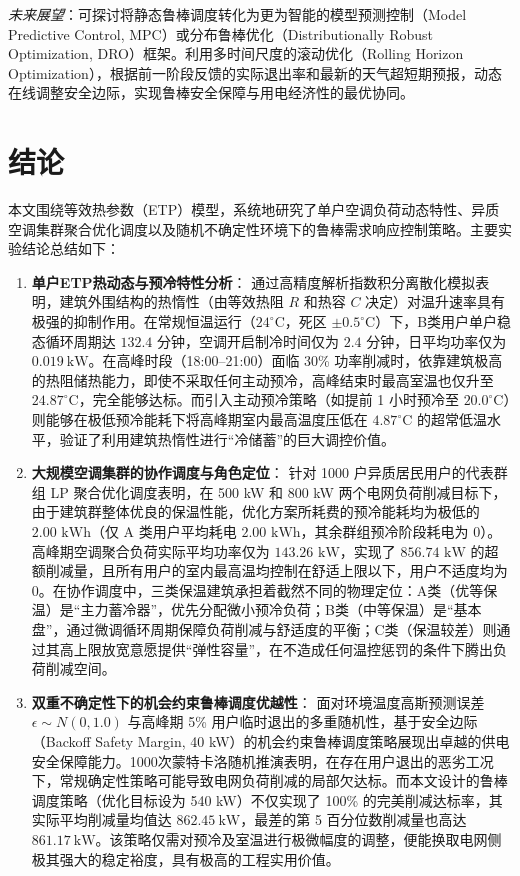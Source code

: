\documentclass[12pt,a4paper]{article}
\begin{document}
\begin{enumerate}
    \textit{未来展望}：可探讨将静态鲁棒调度转化为更为智能的模型预测控制（Model Predictive Control, MPC）或分布鲁棒优化（Distributionally Robust Optimization, DRO）框架。利用多时间尺度的滚动优化（Rolling Horizon Optimization），根据前一阶段反馈的实际退出率和最新的天气超短期预报，动态在线调整安全边际，实现鲁棒安全保障与用电经济性的最优协同。
\end{enumerate}


\section{结论}
本文围绕等效热参数（ETP）模型，系统地研究了单户空调负荷动态特性、异质空调集群聚合优化调度以及随机不确定性环境下的鲁棒需求响应控制策略。主要实验结论总结如下：

\begin{enumerate}
    \item \textbf{单户ETP热动态与预冷特性分析}：
    通过高精度解析指数积分离散化模拟表明，建筑外围结构的热惰性（由等效热阻 $R$ 和热容 $C$ 决定）对温升速率具有极强的抑制作用。在常规恒温运行（$24^\circ\text{C}$，死区 $\pm 0.5^\circ\text{C}$）下，B类用户单户稳态循环周期达 $132.4$ 分钟，空调开启制冷时间仅为 $2.4$ 分钟，日平均功率仅为 $0.019\ \text{kW}$。在高峰时段（18:00--21:00）面临 30\% 功率削减时，依靠建筑极高的热阻储热能力，即使不采取任何主动预冷，高峰结束时最高室温也仅升至 $24.87^\circ\text{C}$，完全能够达标。而引入主动预冷策略（如提前 1 小时预冷至 $20.0^\circ\text{C}$）则能够在极低预冷能耗下将高峰期室内最高温度压低在 $4.87^\circ\text{C}$ 的超常低温水平，验证了利用建筑热惰性进行“冷储蓄”的巨大调控价值。
    
    \item \textbf{大规模空调集群的协作调度与角色定位}：
    针对 1000 户异质居民用户的代表群组 LP 聚合优化调度表明，在 500 kW 和 800 kW 两个电网负荷削减目标下，由于建筑群整体优良的保温性能，优化方案所耗费的预冷能耗均为极低的 $2.00\text{ kWh}$（仅 A 类用户平均耗电 $2.00\text{ kWh}$，其余群组预冷阶段耗电为 $0$）。高峰期空调聚合负荷实际平均功率仅为 $143.26\text{ kW}$，实现了 $856.74\text{ kW}$ 的超额削减量，且所有用户的室内最高温均控制在舒适上限以下，用户不适度均为 $0$。在协作调度中，三类保温建筑承担着截然不同的物理定位：A类（优等保温）是“主力蓄冷器”，优先分配微小预冷负荷；B类（中等保温）是“基本盘”，通过微调循环周期保障负荷削减与舒适度的平衡；C类（保温较差）则通过其高上限放宽意愿提供“弹性容量”，在不造成任何温控惩罚的条件下腾出负荷削减空间。
    
    \item \textbf{双重不确定性下的机会约束鲁棒调度优越性}：
    面对环境温度高斯预测误差 $\epsilon \sim N(0, 1.0)$ 与高峰期 5\% 用户临时退出的多重随机性，基于安全边际（Backoff Safety Margin, 40 kW）的机会约束鲁棒调度策略展现出卓越的供电安全保障能力。1000次蒙特卡洛随机推演表明，在存在用户退出的恶劣工况下，常规确定性策略可能导致电网负荷削减的局部欠达标。而本文设计的鲁棒调度策略（优化目标设为 540 kW）不仅实现了 100\% 的完美削减达标率，其实际平均削减量均值达 $862.45\ \text{kW}$，最差的第 5 百分位数削减量也高达 $861.17\ \text{kW}$。该策略仅需对预冷及室温进行极微幅度的调整，便能换取电网侧极其强大的稳定裕度，具有极高的工程实用价值。
\end{enumerate}
\end{document}
